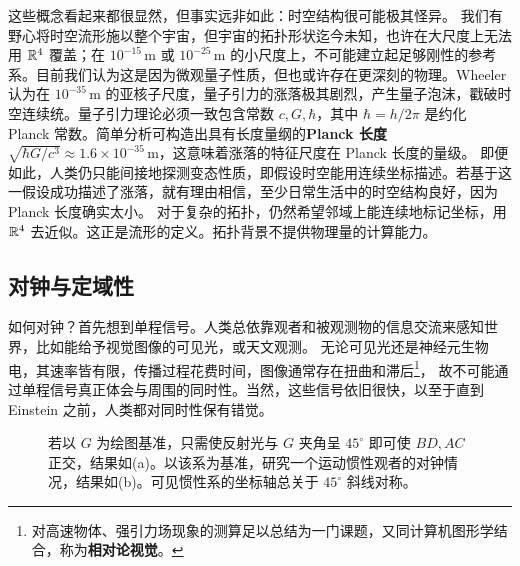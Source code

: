 这些概念看起来都很显然，但事实远非如此：时空结构很可能极其怪异。
我们有野心将时空流形施以整个宇宙，但宇宙的拓扑形状迄今未知，也许在大尺度上无法用 $\mathbb{R}^4$ 覆盖；在 $10^{-15}$\,m 或 $10^{-25}$\,m 的小尺度上，不可能建立起足够刚性的参考系。目前我们认为这是因为微观量子性质，但也或许存在更深刻的物理。Wheeler 认为在 $10^{-35}$\,m 的亚核子尺度，量子引力的涨落极其剧烈，产生量子泡沫，戳破时空连续统。量子引力理论必须一致包含常数 $c,G,\hbar$，其中 $\hbar=h/2\pi$ 是约化 Planck 常数。简单分析可构造出具有长度量纲的\textbf{Planck 长度} $\sqrt{\hbar G/c^3}\approx 1.6\times10^{-35}$\,m，这意味着涨落的特征尺度在 Planck 长度的量级。
即便如此，人类仍只能间接地探测变态性质，即假设时空能用连续坐标描述。若基于这一假设成功描述了涨落，就有理由相信，至少日常生活中的时空结构良好，因为 Planck 长度确实太小。
对于复杂的拓扑，仍然希望邻域上能连续地标记坐标，用 $\mathbb{R}^4$ 去近似。这正是流形的定义。拓扑背景不提供物理量的计算能力。


\subsection{对钟与定域性}

如何对钟？首先想到单程信号。人类总依靠观者和被观测物的信息交流来感知世界，比如能给予视觉图像的可见光，或天文观测。
无论可见光还是神经元生物电，其速率皆有限，传播过程花费时间，图像通常存在扭曲和滞后\footnote{对高速物体、强引力场现象的测算足以总结为一门课题，又同计算机图形学结合，称为\textbf{相对论视觉}。}，
故不可能通过单程信号真正体会与周围的同时性。当然，这些信号依旧很快，以至于直到 Einstein 之前，人类都对同时性保有错觉。

\begin{figure}[ht]
    \centering
    \qquad
    \caption{\small 若以 $G$ 为绘图基准，只需使反射光与 $G$ 夹角呈 $45^\circ$ 即可使 $BD,AC$ 正交，结果如(a)。以该系为基准，研究一个运动惯性观者的对钟情况，结果如(b)。可见惯性系的坐标轴总关于 $45^\circ$ 斜线对称。}
    \label{fig:clock_syn}
\end{figure}

